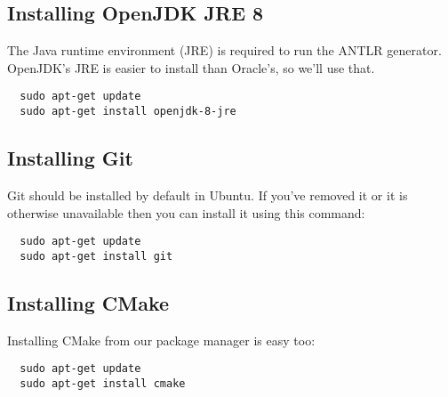 \documentclass[../setup.tex]{subfiles}
\begin{document}
\subsection{Installing OpenJDK JRE 8}
The Java runtime environment (JRE) is required to run the ANTLR generator. OpenJDK's JRE is easier
to install than Oracle's, so we'll use that.
\begin{lstlisting}
  sudo apt-get update
  sudo apt-get install openjdk-8-jre
\end{lstlisting}

\subsection{Installing Git}
Git should be installed by default in Ubuntu. If you've removed it or it is otherwise unavailable
then you can install it using this command:
\begin{lstlisting}
  sudo apt-get update
  sudo apt-get install git
\end{lstlisting}

\subsection{Installing CMake}
Installing CMake from our package manager is easy too:
\begin{lstlisting}
  sudo apt-get update
  sudo apt-get install cmake
\end{lstlisting}
\end{document}

